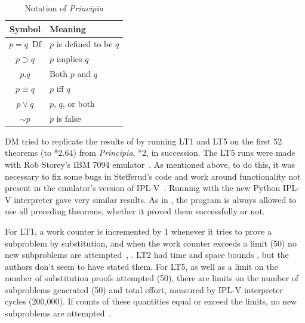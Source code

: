 \documentclass[journal]{IEEEtran}
\begin{document}
\begin{table}[h]
\centering
\caption{Notation of \textit{Principia}}
\label{tab:notation}
\begin{tabular}{cl}
\toprule
\textbf{Symbol} & \textbf{Meaning} \\
\midrule
$p=q$\ {\rm Df} & $p$ is defined to be $q$ \\
$p\supset q$ & $p$ implies $q$ \\
$p.q$ & Both $p$ and $q$ \\
$p\equiv q$ & $p$ iff $q$ \\
$p\vee q$ & $p$, $q$, or both \\
$\sim p$ & $p$ is false  \\
\bottomrule
\end{tabular}
\end{table}

DM tried to replicate the results of \cite{LT1957}
by running LT1 and LT5 on the first 52 theorems (to *2.64)
from {\em Principia}, *2, in 
succession.  The LT5 runs were made with Rob Storey's
IBM 7094 emulator~\cite{ibsys}.  As mentioned above,
to do this, it was
necessary to fix some bugs in Stefferud's code and work 
around functionality not present in the emulator's version
of IPL-V~\cite{moewsrepo2}.  Running with the new Python
IPL-V interpreter gave very similar results.
As in \cite{LT1957}, 
the program is always allowed to use
all preceding theorems, whether it proved them successfully
or not.  

%
%
For LT1, a work counter is incremented by 1 whenever it tries
to prove a subproblem by substitution, and when the work counter
exceeds a limit (50) no new subproblems are 
attempted~\cite{moewsrepo}, \cite[p.~47]{LT1956b}.
LT2 had time and space bounds \cite[p.~223]{LT1957},
but the authors don't seem to have stated them.
%
%
For LT5, as well as a limit on the number of substitution proofs
attempted (50), there are limits on the number of subproblems
generated (50) and total effort, measured by IPL-V interpreter cycles (200,000).
If counts of these quantities equal or exceed the limits,
no new subproblems are attempted~\cite[pp.~154-155]{stefferud1963lt}.
\end{document}
